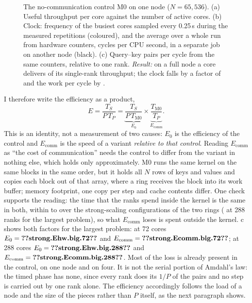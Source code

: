 \begin{figure}[t]
\centering
{}
\caption{The no-communication control M0 on one node ($N=65{,}536$). (a) Useful
throughput per core against the number of active cores. (b) Clock: frequency of the
busiest cores sampled every 0.25\,s during the measured repetitions (coloured), and
the average over a whole run from hardware counters, cycles per CPU second, in a
separate job on another node (black). (c) Query--key pairs per cycle from the same
counters, relative to one rank. \emph{Result:} on a full node a core delivers
 of its single-rank throughput; the clock falls by a factor of
 and the work per cycle by .}
\label{fig:hardware}
\end{figure}

I therefore write the efficiency as a product,
\[
 E=\frac{T_S}{P\,T_P}=\underbrace{\frac{T_S}{P\,T_{\text{M0}}}}_{E_0}\times
 \underbrace{\frac{T_{\text{M0}}}{T_P}}_{E_\text{comm}} .
\]
This is an identity, not a measurement of two causes: $E_0$ is the efficiency of
the control and $E_\text{comm}$ is the speed of a variant \emph{relative to that
control}. Reading $E_\text{comm}$ as ``the cost of communication'' needs the control
to differ from the variant in nothing else, which holds only approximately. M0 runs
the same kernel on the same blocks in the same order, but it holds all $N$ rows of
keys and values and copies each block out of that array, where a ring receives the
block into its work buffer; memory footprint, one copy per step and cache contents
differ. One check supports the reading: the time that the ranks spend inside the
kernel is the same in both, within  to
 over the  strong-scaling
configurations of the two rings ( at 288 ranks for
the largest problem), so what $E_\text{comm}$ loses is spent outside the kernel.
c shows both factors for the largest problem: at 72 cores
$E_0=\n{strong.Ehw.big.72}$ and $E_\text{comm}=\n{strong.Ecomm.big.72}$; at 288 cores
$E_0=\n{strong.Ehw.big.288}$ and $E_\text{comm}=\n{strong.Ecomm.big.288}$. Most of the
loss is already present in the control, on one node and on four. It is not the
serial portion of Amdahl's law: the timed phase has none, since every rank does
its $1/P$ of the pairs and no step is carried out by one rank alone. The
efficiency accordingly follows the load of a node and the size of the pieces
rather than $P$ itself, as the next paragraph shows.

